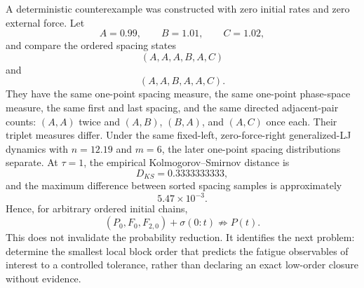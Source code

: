 A deterministic counterexample was constructed with zero initial rates and zero external force. Let
\begin{equation}
A=0.99,\qquad B=1.01,\qquad C=1.02,
\end{equation}
and compare the ordered spacing states
\begin{equation}
(A,A,A,B,A,C)
\end{equation}
and
\begin{equation}
(A,A,B,A,A,C).
\end{equation}
They have the same one-point spacing measure, the same one-point phase-space measure, the same first and last spacing, and the same directed adjacent-pair counts: $(A,A)$ twice and $(A,B)$, $(B,A)$, and $(A,C)$ once each. Their triplet measures differ. Under the same fixed-left, zero-force-right generalized-LJ dynamics with $n=12.19$ and $m=6$, the later one-point spacing distributions separate. At $\tau=1$, the empirical Kolmogorov--Smirnov distance is
\begin{equation}
D_{KS}=0.3333333333,
\end{equation}
and the maximum difference between sorted spacing samples is approximately
\begin{equation}
5.47\times10^{-3}.
\end{equation}
Hence, for arbitrary ordered initial chains,
\begin{equation}
(P_0,F_0,F_{2,0})+\sigma(0:t)\not\Rightarrow P(t).
\end{equation}
This does not invalidate the probability reduction. It identifies the next problem: determine the smallest local block order that predicts the fatigue observables of interest to a controlled tolerance, rather than declaring an exact low-order closure without evidence.

